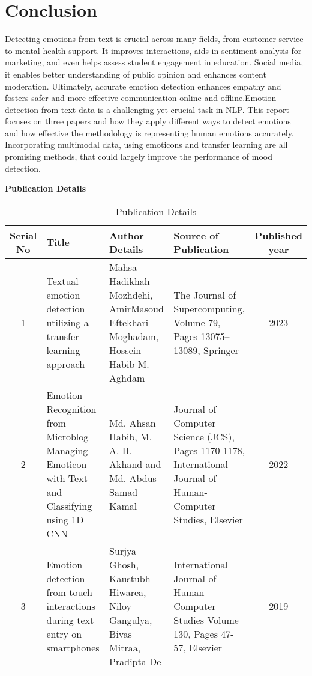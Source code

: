 \documentclass[12pt]{article} %
\begin{document}
\section{Conclusion }
Detecting emotions from text is crucial across many fields, from customer service to mental health support. It improves interactions, aids in sentiment analysis for marketing, and even helps assess student engagement in education. Social media, it enables better understanding of public opinion and enhances content moderation. Ultimately, accurate emotion detection enhances empathy and fosters safer and more effective communication online and offline.Emotion detection from text data is a challenging yet crucial task in NLP.  This report focuses on three papers and how they apply different ways to detect emotions and how effective the methodology is representing human emotions accurately. Incorporating multimodal data, using emoticons and transfer learning are all promising methods, that could largely improve the performance of mood detection.

\newpage



\newpage
\large
 \textbf{Publication Details}         
\vspace{1cm}              
\begin{table}[h!]
  \centering
  \caption{Publication Details}
  \label{tab:publication_details}
  \begin{tabular}{|c|p{3cm}|p{3cm}|p{3cm}|c|}
    \hline
    \textbf{Serial No} & \textbf{Title} & \textbf{Author Details} & \textbf{Source of Publication} & \textbf{Published year}\\ \hline
    1 &Textual emotion detection utilizing a transfer learning approach
    & Mahsa Hadikhah Mozhdehi, AmirMasoud Eftekhari Moghadam, Hossein Habib M. Aghdam & The Journal of Supercomputing, Volume 79, Pages 13075–13089, Springer & 2023 \\ \hline
    2 & Emotion Recognition from Microblog Managing Emoticon with Text and Classifying using 1D CNN & Md. Ahsan Habib, M. A. H. Akhand and Md. Abdus Samad Kamal & Journal of Computer Science (JCS), Pages 1170-1178, International Journal of Human-Computer Studies, Elsevier & 2022 \\ \hline                                         
    3 & Emotion detection from touch interactions during text entry on smartphones & Surjya Ghosh, Kaustubh Hiwarea, Niloy Gangulya, Bivas Mitraa, Pradipta De & International Journal of Human-Computer Studies Volume 130, Pages 47-57, Elsevier & 2019 \\ \hline
  \end{tabular}
\end{table}
\end{document}
